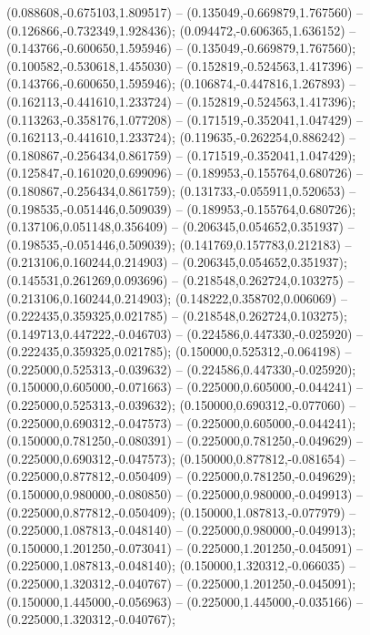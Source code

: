  (0.088608,-0.675103,1.809517) -- (0.135049,-0.669879,1.767560) -- (0.126866,-0.732349,1.928436);
 (0.094472,-0.606365,1.636152) -- (0.143766,-0.600650,1.595946) -- (0.135049,-0.669879,1.767560);
 (0.100582,-0.530618,1.455030) -- (0.152819,-0.524563,1.417396) -- (0.143766,-0.600650,1.595946);
 (0.106874,-0.447816,1.267893) -- (0.162113,-0.441610,1.233724) -- (0.152819,-0.524563,1.417396);
 (0.113263,-0.358176,1.077208) -- (0.171519,-0.352041,1.047429) -- (0.162113,-0.441610,1.233724);
 (0.119635,-0.262254,0.886242) -- (0.180867,-0.256434,0.861759) -- (0.171519,-0.352041,1.047429);
 (0.125847,-0.161020,0.699096) -- (0.189953,-0.155764,0.680726) -- (0.180867,-0.256434,0.861759);
 (0.131733,-0.055911,0.520653) -- (0.198535,-0.051446,0.509039) -- (0.189953,-0.155764,0.680726);
 (0.137106,0.051148,0.356409) -- (0.206345,0.054652,0.351937) -- (0.198535,-0.051446,0.509039);
 (0.141769,0.157783,0.212183) -- (0.213106,0.160244,0.214903) -- (0.206345,0.054652,0.351937);
 (0.145531,0.261269,0.093696) -- (0.218548,0.262724,0.103275) -- (0.213106,0.160244,0.214903);
 (0.148222,0.358702,0.006069) -- (0.222435,0.359325,0.021785) -- (0.218548,0.262724,0.103275);
 (0.149713,0.447222,-0.046703) -- (0.224586,0.447330,-0.025920) -- (0.222435,0.359325,0.021785);
 (0.150000,0.525312,-0.064198) -- (0.225000,0.525313,-0.039632) -- (0.224586,0.447330,-0.025920);
 (0.150000,0.605000,-0.071663) -- (0.225000,0.605000,-0.044241) -- (0.225000,0.525313,-0.039632);
 (0.150000,0.690312,-0.077060) -- (0.225000,0.690312,-0.047573) -- (0.225000,0.605000,-0.044241);
 (0.150000,0.781250,-0.080391) -- (0.225000,0.781250,-0.049629) -- (0.225000,0.690312,-0.047573);
 (0.150000,0.877812,-0.081654) -- (0.225000,0.877812,-0.050409) -- (0.225000,0.781250,-0.049629);
 (0.150000,0.980000,-0.080850) -- (0.225000,0.980000,-0.049913) -- (0.225000,0.877812,-0.050409);
 (0.150000,1.087813,-0.077979) -- (0.225000,1.087813,-0.048140) -- (0.225000,0.980000,-0.049913);
 (0.150000,1.201250,-0.073041) -- (0.225000,1.201250,-0.045091) -- (0.225000,1.087813,-0.048140);
 (0.150000,1.320312,-0.066035) -- (0.225000,1.320312,-0.040767) -- (0.225000,1.201250,-0.045091);
 (0.150000,1.445000,-0.056963) -- (0.225000,1.445000,-0.035166) -- (0.225000,1.320312,-0.040767);
